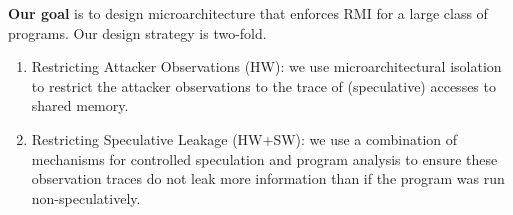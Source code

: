 \noindent\textbf{Our goal} is to design microarchitecture that enforces RMI for a large class of programs.
Our design strategy is two-fold.

\begin{enumerate}[leftmargin=*, align=left, itemsep=0ex, topsep=0ex]
    \item Restricting Attacker Observations (HW): we use microarchitectural isolation to restrict the attacker observations to the trace of (speculative) accesses to shared memory.
    \item Restricting Speculative Leakage (HW+SW): we use a combination of mechanisms for controlled speculation and program analysis to ensure these observation traces do not leak more information than if the program was run non-speculatively.
\end{enumerate}

